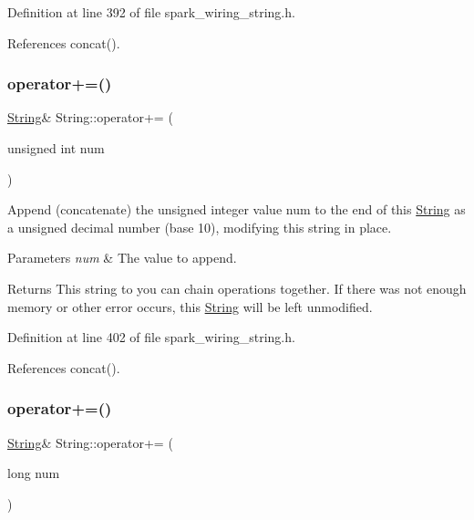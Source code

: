 Definition at line 392 of file spark\+\_\+wiring\+\_\+string.\+h.



References concat().

\mbox{\label{class_string_aca854f6e679697e98e940b8d2b51956e}} 
\subsubsection{\texorpdfstring{operator+=()}{operator+=()}\hspace{0.1cm}{\footnotesize\ttfamily [6/8]}}
{\footnotesize\ttfamily \hyperlink{class_string}{String}\& String\+::operator+= (\begin{DoxyParamCaption}\item[{unsigned int}]{num }\end{DoxyParamCaption})\hspace{0.3cm}{\ttfamily [inline]}}



Append (concatenate) the unsigned integer value num to the end of this \hyperlink{class_string}{String} as a unsigned decimal number (base 10), modifying this string in place. 


\begin{DoxyParams}{Parameters}
{\em num} & The value to append.\\
\hline
\end{DoxyParams}
\begin{DoxyReturn}{Returns}
This string to you can chain operations together. If there was not enough memory or other error occurs, this \hyperlink{class_string}{String} will be left unmodified. 
\end{DoxyReturn}


Definition at line 402 of file spark\+\_\+wiring\+\_\+string.\+h.



References concat().

\mbox{\label{class_string_a2638de5d162cb9395bd2837458cef124}} 
\subsubsection{\texorpdfstring{operator+=()}{operator+=()}\hspace{0.1cm}{\footnotesize\ttfamily [7/8]}}
{\footnotesize\ttfamily \hyperlink{class_string}{String}\& String\+::operator+= (\begin{DoxyParamCaption}\item[{long}]{num }\end{DoxyParamCaption})\hspace{0.3cm}{\ttfamily [inline]}}



